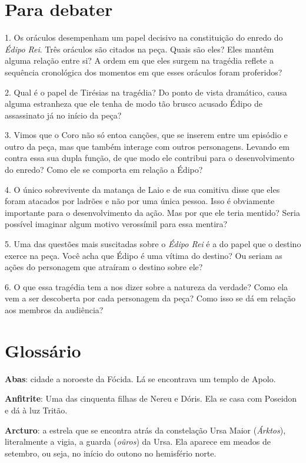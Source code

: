\chapter{Para debater}

1. Os oráculos desempenham um papel decisivo na constituição do enredo
do \emph{Édipo Rei}. Três oráculos são citados na peça. Quais são eles?
Eles mantêm alguma relação entre si? A ordem em que eles surgem na
tragédia reflete a sequência cronológica dos momentos em que esses
oráculos foram proferidos?

2. Qual é o papel de Tirésias na tragédia? Do ponto de vista dramático,
causa alguma estranheza que ele tenha de modo tão brusco acusado Édipo
de assassinato já no início da peça?

3. Vimos que o Coro não só entoa canções, que se inserem entre um
episódio e outro da peça, mas que também interage com outros
personagens. Levando em contra essa sua dupla função, de que modo ele
contribui para o desenvolvimento do enredo? Como ele se comporta em
relação a Édipo?

4. O único sobrevivente da matança de Laio e de sua comitiva disse que
eles foram atacados por ladrões e não por uma única pessoa. Isso é
obviamente importante para o desenvolvimento da ação. Mas por que ele
teria mentido? Seria possível imaginar algum motivo verossímil para essa
mentira?

5. Uma das questões mais suscitadas sobre o \emph{Édipo Rei} é a do
papel que o destino exerce na peça. Você acha que Édipo é uma vítima do
destino? Ou seriam as ações do personagem que atraíram o destino sobre
ele?

6. O que essa tragédia tem a nos dizer sobre a natureza da verdade? Como
ela vem a ser descoberta por cada personagem da peça? Como isso se dá em
relação aos membros da audiência?

\chapter{Glossário}

\textbf{Abas}: cidade a noroeste da Fócida. Lá se encontrava um
templo de Apolo.

\textbf{Anfitrite}: Uma das cinquenta filhas de Nereu e Dóris. Ela se
casa com Poseidon e dá à luz Tritão.

\textbf{Arcturo}: a estrela que se encontra atrás da constelação Ursa
Maior (\emph{Árktos}), literalmente a vigia, a guarda (\emph{oûros}) da
Ursa. Ela aparece em meados de setembro, ou seja, no início do outono no
hemisfério norte.

